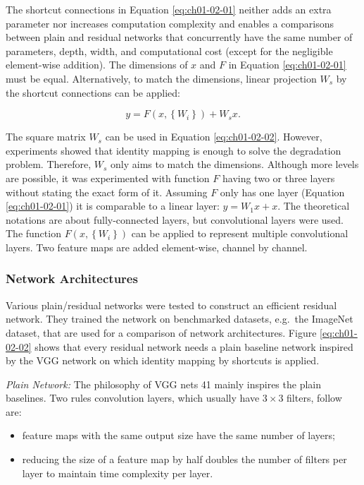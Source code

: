 \documentclass[
]{krantz}
\providecommand{\tightlist}{%
  \setlength{\itemsep}{0pt}\setlength{\parskip}{0pt}}
\begin{document}
The shortcut connections in Equation \eqref{eq:ch01-02-01} neither adds an extra parameter nor increases computation complexity and enables a comparisons between plain and residual networks that concurrently have the same number of parameters, depth, width, and computational cost (except for the negligible element-wise addition).
The dimensions of \(x\) and \(F\) in Equation \eqref{eq:ch01-02-01} must be equal. Alternatively, to match the dimensions, linear projection \(W_s\) by the shortcut connections can be applied:

\begin{equation}
\label{eq:ch01-02-02}
y = F  \left( x,\left\{  W_i\right\} \right)+ W_sx.
\end{equation}

The square matrix \(W_s\) can be used in Equation \eqref{eq:ch01-02-02}. However, experiments showed that identity mapping is enough to solve the degradation problem. Therefore, \(W_s\) only aims to match the dimensions. Although more levels are possible, it was experimented with function \(F\) having two or three layers without stating the exact form of it. Assuming \(F\) only has one layer (Equation \eqref{eq:ch01-02-01}) it is comparable to a linear layer: \(y = W_1 x + x\). The theoretical notations are about fully-connected layers, but convolutional layers were used. The function \(F \left( x,\left\{ W_i\right\} \right)\) can be applied to represent multiple convolutional layers. Two feature maps are added element-wise, channel by channel.

\hypertarget{network-architectures}{%
\subsubsection{Network Architectures}\label{network-architectures}}

Various plain/residual networks were tested to construct an efficient residual network. They trained the network on benchmarked datasets, e.g.~the ImageNet dataset, that are used for a comparison of network architectures. Figure \eqref{eq:ch01-02-02} shows that every residual network needs a plain baseline network inspired by the VGG \citep{vgg} network on which identity mapping by shortcuts is applied.

\emph{Plain Network:} The philosophy of VGG nets 41 mainly inspires the plain baselines. Two rules convolution layers, which usually have \(3\times 3\) filters, follow are:

\begin{itemize}
\tightlist
\item
  feature maps with the same output size have the same number of layers;
\item
  reducing the size of a feature map by half doubles the number of filters per layer to maintain time complexity per layer.
\end{itemize}
\end{document}
